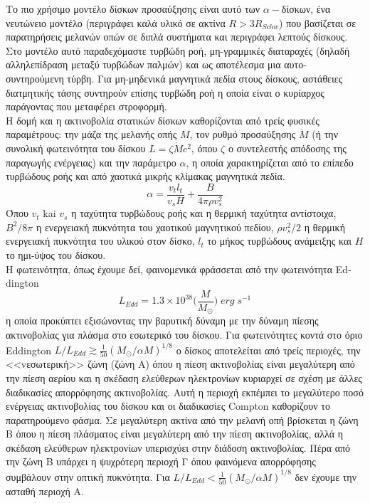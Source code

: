 Το πιο χρήσιμο μοντέλο δίσκων προσαύξησης είναι αυτό των $\alpha-$δίσκων, ένα νευτώνειο μοντέλο (περιγράφει καλά υλικό σε ακτίνα $R>3R_{Schw}$) που βασίζεται σε παρατηρήσεις μελανών οπών σε διπλά συστήματα και περιγράφει λεπτούς δίσκους. Στο μοντέλο αυτό παραδεχόμαστε τυρβώδη ροή, μη-γραμμικές διαταραχές (δηλαδή αλληλεπίδραση μεταξύ τυρβώδων παλμών) και ως αποτέλεσμα μια αυτο-συντηρούμενη τύρβη\cite{ShakuraBlackHoles}. 
Για μη-μηδενικά μαγνητικά πεδία στους δίσκους, αστάθειες διατμητικής τάσης συντηρούν επίσης τυρβώδη ροή η οποία είναι ο κυρίαρχος παράγοντας που μεταφέρει στροφορμή\cite{Blackman98}. \\
Η δομή και η ακτινοβολία στατικών δίσκων καθορίζονται από τρείς φυσικές παραμέτρους: την μάζα της μελανής οπής $Μ$, τον ρυθμό προσαύξησης $\dot M$ (ή την συνολική φωτεινότητα του δίσκου $L = \zeta \dot M c^2$, όπου $\zeta$ ο συντελεστής απόδοσης της παραγωγής ενέργειας) και την παράμετρο $\alpha$, η οποία χαρακτηρίζεται από το επίπεδο τυρβώδους ροής και από χαοτικά μικρής κλίμακας μαγνητικά πεδία\cite{ShakuraInstability}.
\begin{equation}
    \alpha = \dfrac{v_t l_t}{v_s Η} + \dfrac{B}{4\pi \rho v_s^2}
\end{equation}
Όπου $v_t$ kai $v_s$ η ταχύτητα τυρβώδους ροής και η θερμική ταχύτητα αντίστοιχα, $B^2/8\pi$ η ενεργειακή πυκνότητα του χαοτικού μαγνητικού πεδίου, $\rho v_s^2/2$ η θερμική ενεργειακή πυκνότητα του υλικού στον δίσκο, $l_t$ το μήκος τυρβώδους ανάμειξης και $Η$ το ημι-ύψος του δίσκου.\\
Η φωτεινότητα, όπως έχουμε δεί, φαινομενικά φράσσεται από την φωτεινότητα \textlatin{Eddington} $$L_{Edd} = 1.3\times10^{38} \Big(\dfrac{M}{M_\odot}   \Big) \; erg \; s^{-1}$$ 
η οποία προκύπτει εξισώνοντας την βαρυτική δύναμη με την δύναμη πίεσης ακτινοβολίας για πλάσμα στο εσωτερικό του δίσκου. Για φωτεινότητες κοντά στο όριο \textlatin{Eddington} $L/L_{Edd} \gtrsim \frac{1}{50} (M_\odot/\alpha M)^{1/8}$ ο δίσκος αποτελείται από τρείς περιοχές, την <<vεσωτερική>> ζώνη (ζώνη Α) όπου η πίεση ακτινοβολίας είναι μεγαλύτερη από την πίεση αερίου και η σκέδαση ελεύθερων ηλεκτρονίων κυριαρχεί σε σχέση με άλλες διαδικασίες απορρόφησης ακτινοβολίας. Αυτή η περιοχή εκπέμπει το μεγαλύτερο ποσό ενέργειας ακτινοβολίας του δίσκου και οι διαδικασίες \textlatin{Compton} καθορίζουν το παρατηρούμενο φάσμα. Σε μεγαλύτερη ακτίνα από την μελανή οπή βρίσκεται η ζώνη Β όπου η πίεση πλάσματος είναι μεγαλύτερη από την πίεση ακτινοβολίας, αλλά η σκέδαση ελεύθερων ηλεκτρονίων υπερισχύει στην διάδοση ακτινοβολίας. Πέρα από την ζώνη Β υπάρχει η ψυχρότερη περιοχή Γ όπου φαινόμενα απορρόφησης συμβάλουν στην οπτική πυκνότητα\cite{ShakuraInstability}.
Για $L/L_{Edd} < \frac{1}{50} (M_\odot/\alpha M)^{1/8}$  δεν έχουμε την ασταθή περιοχή Α. 

